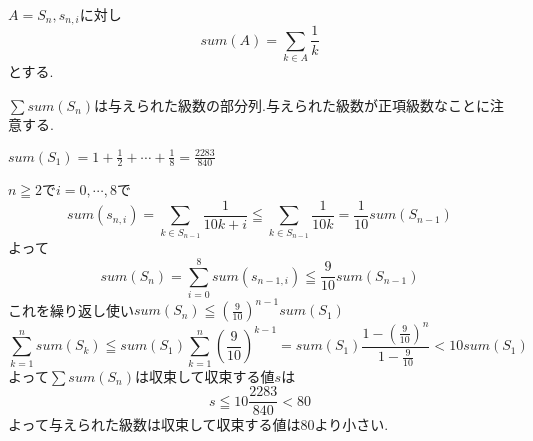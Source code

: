 \documentclass{jsarticle}
\begin{document}
$A=S_n,s_{n,i}$に対し
\[
sum(A) = \sum_{k\in A}\frac{1}{k}
\]
とする.

$\sum sum(S_n)$は与えられた級数の部分列.与えられた級数が正項級数なことに注意する.

$sum(S_1)=1+\frac{1}{2}+\cdots + \frac{1}{8}=\frac{2283}{840}$

$n\geqq 2$で$i=0,\cdots ,8$で
\[sum(s_{n,i})=\sum_{k\in S_{n-1}}
\frac{1}{10k+i}\leqq \sum_{k\in S_{n-1}}\frac{1}{10k}=\frac{1}{10}sum(S_{n-1})\]
よって
\[sum(S_n)=\sum_{i=0}^8sum(s_{n-1,i})\leqq \frac{9}{10}sum(S_{n-1})\]
これを繰り返し使い$sum(S_n)\leqq (\frac{9}{10})^{n-1}sum(S_1)$
\[
\sum_{k=1}^n sum(S_k)\leqq sum(S_1) \sum_{k=1}^n (\frac{9}{10})^{k-1}= sum(S_1)\frac{1-(\frac{9}{10})^n}{1-\frac{9}{10}}<10sum(S_1)
\]
よって$\sum sum(S_n)$は収束して収束する値$s$は
\[s\leqq 10\frac{2283}{840} < 80\]
よって与えられた級数は収束して収束する値は80より小さい.
\end{document}

